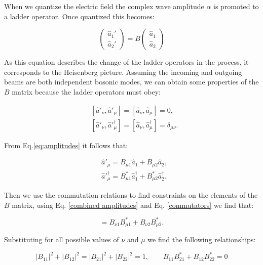 \documentclass[11pt]{article}
\begin{document}
When we quantize the electric field the complex wave amplitude $\alpha$ is promoted to a ladder operator. Once quantized this becomes:

\begin{equation}
\begin{pmatrix} \hat{a}_{1}' \\ \hat{a}_{2}' \end{pmatrix}=B\begin{pmatrix} \hat{a}_{1} \\ \hat{a}_{2} \end{pmatrix}
\label{eq:amplitudes}
\end{equation}

As this equation describes the change of the ladder operators in the process, it corresponds to the Heisenberg picture. Assuming the incoming and outgoing beams are both independent bosonic modes, we can obtain some properties of the $B$ matrix because the ladder operators must obey:

\begin{align}
&[\hat{a}'_{\nu},\hat{a}'_{\mu}]=[\hat{a}_{\nu},\hat{a}_{\mu}]=0,\\
&[\hat{a}'_{\nu},\hat{a}'^{\dagger}_{\mu}]=[\hat{a}_{\nu},\hat{a}^{\dagger}_{\mu}]=\delta_{\mu \nu}.
\label{commutators}
\end{align}

From Eq.\ref{eq:amplitudes} it follows that:

\begin{align}
&\hat{a}'_{\mu}=B_{\mu 1}\hat{a}_{1}+B_{\mu 2} \hat{a}_{2}, \\
&\hat{a}'^{\dagger}_{\mu}=B_{\mu 1}^{*}\hat{a}^{\dagger}_{1}+B_{\mu 2}^{*} \hat{a}^{\dagger}_{2}. 
\label{combined amplitudes}
\end{align}

Then we use the commutation relations to find constraints on the elements of the $B$ matrix, using Eq. \ref{combined amplitudes} and Eq. \ref{commutators} we find that:

\begin{equation}
   [\hat{a}'_{\nu},\hat{a}'^{\dagger}_{\mu}]=B_{\nu 1} B_{\mu 1}^{*}+B_{\nu 2} B_{\mu 2}^{*} .
\end{equation}

Substituting for all possible values of $\nu$ and $\mu$ we find the following relationships:

\begin{equation}
|B_{11}|^{2}+|B_{12}|^{2}=|B_{21}|^{2}+|B_{22}|^{2}=1 ,\qquad B_{11} B_{21}^{*}+B_{12} B_{22}^{*}=0
\end{equation}
\end{document}

